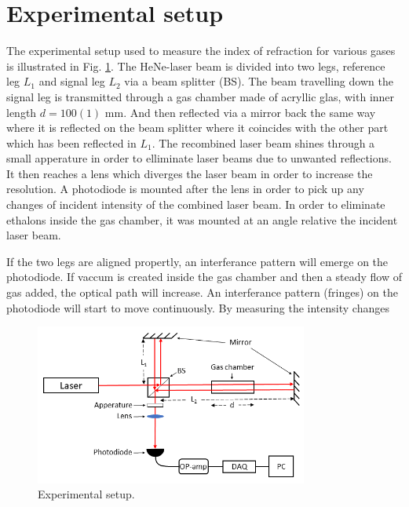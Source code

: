 
\section{Experimental setup}

The experimental setup used to measure the index of refraction for various gases is illustrated in Fig. \ref{fig:experimentalSetup}. The HeNe-laser beam is divided into two legs, reference leg $L_1$ and signal leg $L_2$ via a beam splitter (BS). The beam travelling down the signal leg is transmitted through a gas chamber made of acryllic glas, with inner length $d=100(1)$ mm. And then reflected via a mirror back the same way where it is reflected on the beam splitter where it coincides with the other part which has been reflected in $L_1$. The recombined laser beam shines through a small apperature in order to elliminate laser beams due to unwanted reflections. It then reaches a lens which diverges the laser beam in order to increase the resolution. A photodiode is mounted after the lens in order to pick up any changes of incident intensity of the combined laser beam. In order to eliminate ethalons inside the gas chamber, it was mounted at an angle relative the incident laser beam.

If the two legs are aligned propertly, an interferance pattern will emerge on the photodiode. If vaccum is created inside the gas chamber and then a steady flow of gas added, the optical path will increase. An interferance pattern (fringes) on the photodiode  will start to move continuously. By measuring the intensity changes 




\begin{figure}[H]
  \centering
  \includegraphics[width=0.8\textwidth]{Exp_setup.png}
  \caption{Experimental setup. }
  \label{fig:experimentalSetup}
\end{figure}
